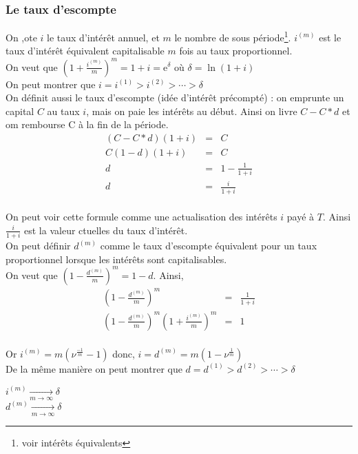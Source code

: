 \documentclass{report}
\newcommand{\e}{\mbox{e}}
\begin{document}
\subsubsection{Le taux d'escompte}
On  ,ote $i$ le taux d'intérêt annuel, et $m$ le nombre de sous période\footnote{voir intérêts équivalents}. $i^{(m)}$ est le taux d'intérêt équivalent capitalisable $m$ fois au taux proportionnel.\\
On veut que $\left( 1+\displaystyle\frac{i^{(m)}}{m}\right)^m=1+i=\displaystyle\e^\delta$ où $\delta = \ln(1+i)$\\
On peut montrer que $i = i^{(1)} > i^{(2)} > \cdots > \delta$\\
On définit aussi le taux d'escompte (idée d'intérêt précompté) : on emprunte un capital $C$ au taux $i$, mais on paie les intérêts au début. Ainsi on livre $C-C*d$ et om rembourse C à la fin de la période.
\begin{eqnarray}
(C-C*d)(1+i) &=& C\nonumber\\
C(1-d)(1+i)&=& C\nonumber\\
d&=& 1-\displaystyle\frac{1}{1+i}\nonumber\\
d&=&\displaystyle\frac{i}{1+i}\nonumber
\end{eqnarray}\\
On peut voir cette formule comme une actualisation des intérêts $i$ payé à $T$. Ainsi $\displaystyle\frac{i}{1+i}$ est la valeur ctuelles du taux d'intérêt.\\
On peut définir $d^{(m)}$ comme le taux d'escompte équivalent pour un taux proportionnel lorsque les intérêts sont capitalisables.\\
On veut que  $\left( 1-\displaystyle\frac{d^{(m)}}{m}\right)^m=1-d$. Ainsi, 
\begin{eqnarray}
\left( 1-\displaystyle\frac{d^{(m)}}{m}\right)^m&=&\displaystyle\frac{1}{1+i}\nonumber \\
\left( 1-\displaystyle\frac{d^{(m)}}{m}\right)^m\left( 1+\displaystyle\frac{i^{(m)}}{m}\right)^m &=&1\nonumber
\end{eqnarray}\\
Or $i^{(m)} = m(\nu^{\frac{-1}{m}}-1)$ donc, $i=d^{(m)} = m(1-\nu^{\frac{1}{m}})$\\
De la même manière on peut montrer que $d = d^{(1)} > d^{(2)} > \cdots > \delta$\\
\begin{center}
    $i^{(m)}\displaystyle\xrightarrow[m\to\infty]{}\delta$\\
    $d^{(m)}\displaystyle\xrightarrow[m\to\infty]{}\delta$
\end{center}
\end{document}
